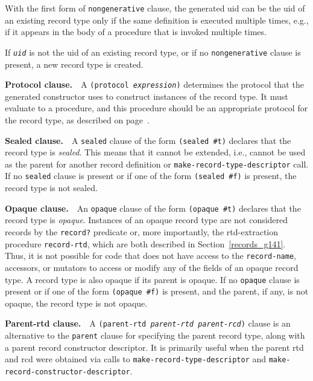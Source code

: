 With the first form of \texttt{nongenerative} clause, the generated
uid can be the uid of an existing record type only if the
same definition is executed multiple times, e.g., if it appears in
the body of a procedure that is invoked multiple times.


If \texttt{\textit{uid}} is not the uid of an existing record type, or if no
\texttt{nongenerative} clause is present, a new record type is created.


\textbf{Protocol clause.}  A \texttt{(protocol \textit{expression})} determines the protocol that
the generated constructor uses to construct instances of the record
type.
It must evaluate to a procedure, and this procedure should be an
appropriate protocol for the record type, as described on
page \pageref{records_page_protocols}.


\textbf{Sealed clause.}  \label{records_s14}\label{records_page_sealed}A \texttt{sealed} clause of the form \texttt{(sealed \#{}t)} declares that the
record type is \textit{sealed}.
This means that it cannot be extended, i.e., cannot be used as the
parent for another record definition or \texttt{make-record-type-descriptor}
call.
If no \texttt{sealed} clause is present or if one of the form
\texttt{(sealed \#{}f)} is present, the record type is not sealed.


\textbf{Opaque clause.}  \label{records_s15}\label{records_page_opaque}An \texttt{opaque} clause of the form \texttt{(opaque \#{}t)} declares that the
record type is \textit{opaque}.
Instances of an opaque record type are not considered records by the
\texttt{record?} predicate or, more importantly, the rtd-extraction
procedure \texttt{record-rtd}, which are both described in
Section \ref{records_g141}.
Thus, it is not possible for code that does not have access to the
\texttt{record-name}, accessors, or mutators to access or modify any
of the fields of an opaque record type.
A record type is also opaque if its parent is opaque.
If no \texttt{opaque} clause is present or if one of the form
\texttt{(opaque \#{}f)} is present, and the parent, if any, is not
opaque, the record type is not opaque.


\textbf{Parent-rtd clause.}  A \texttt{(parent-rtd \textit{parent-rtd} \textit{parent-rcd})} clause is an alternative
to the \texttt{parent} clause for specifying the parent record type, along
with a parent record constructor descriptor.
It is primarily useful when the parent rtd and rcd were obtained via calls to
\texttt{make-record-type-descriptor} and \texttt{make-record-constructor-descriptor}.

